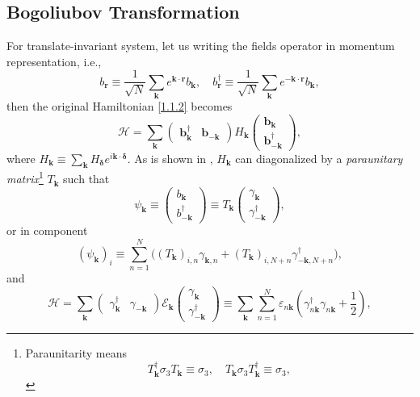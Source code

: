 \documentclass[10pt,nofootinbib]{revtex4}
\begin{document}
	\subsection{Bogoliubov Transformation}
		For translate-invariant system, let us writing the fields operator in momentum representation, i.e.,
		\begin{equation*}
			b_{\bm{r}}\equiv\dfrac{1}{\sqrt{N}}\sum_{\bm{k}}e^{\bm{k\cdot r}}b_{\bm{k}},\quad b_{\bm{r}}^\dagger\equiv\dfrac{1}{\sqrt{N}}\sum_{\bm{k}}e^{-\bm{k\cdot r}}b_{\bm{k}},
		\end{equation*}
		then the original Hamiltonian \eqref{1.1.2} becomes
		\begin{equation}\label{1.3.1}
			\mathcal{H}=\sum_{\bm{k}}\left(\begin{array}{cc}
				\bm{b}_{\bm{k}}^\dagger&\bm{b}_{\bm{-k}}
			\end{array}\right) 
			H_{\bm{k}}
			\left(\begin{array}{c}
				\bm{b}_{\bm{k}}\\\bm{b}_{\bm{-k}}^\dagger
			\end{array}\right) ,
		\end{equation}
		where $H_{\bm{k}}\equiv\sum_{\bm{k}}H_{\bm{\delta}}e^{i\bm{k\cdot\delta}}$. As is shown in \cite{colpa1978diagonalization}, $H_{\bm{k}}$ can diagonalized by a \emph{paraunitary matrix}\footnote{Paraunitarity means \begin{equation*}
			T_{\bm{k}}^\dagger\sigma_3 T_{\bm{k}}\equiv\sigma_3,\quad T_{\bm{k}}\sigma_3 T_{\bm{k}}^\dagger\equiv\sigma_3,
		\end{equation*}} $T_{\bm{k}}$ such that
		\begin{equation*}
			\psi_{\bm{k}}\equiv\left(\begin{array}{c}
				b_{\bm{k}}\\b_{\bm{-k}}^\dagger
			\end{array}\right)\equiv
			T_{\bm{k}}\left(\begin{array}{c}
				\gamma_{\bm{k}}\\\gamma_{\bm{-k}}^\dagger
			\end{array}\right),
		\end{equation*}
		or in component
		\begin{equation}\label{1.3.2}
			(\psi_{\bm{k}})_i\equiv \sum_{n=1}^N\bigg((T_{\bm{k}})_{i,n}\gamma_{\bm{k},n}+(T_{\bm{k}})_{i,N+n}\gamma_{\bm{-k},N+n}^\dagger\bigg),
		\end{equation}
		and
		\begin{equation}\label{1.3.3}
			\mathcal{H}=\sum_{\bm{k}}\left(\begin{array}{cc}
				\gamma_{\bm{k}}^\dagger & \gamma_{\bm{-k}}
			\end{array}\right)
			\mathcal{E}_{\bm{k}}\left(\begin{array}{c}
				\gamma_{\bm{k}}\\\gamma_{\bm{-k}}^\dagger
			\end{array}\right)\equiv\sum_{\bm{k}}\sum_{n=1}^N \varepsilon_{n\bm{k}}\left(\gamma_{n\bm{k}}^\dagger\gamma_{n\bm{k}}+\dfrac{1}{2}\right),
		\end{equation}
\end{document}

